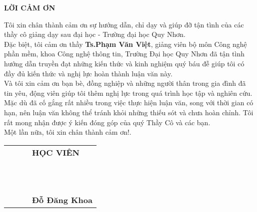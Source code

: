 \newpage
\begin{center}
	\textbf{LỜI CẢM ƠN}
\end{center}
 	
Tôi xin chân thành cảm ơn sự hướng dẫn, chỉ dạy và giúp đỡ tận tình của các thầy cô giảng dạy sau đại học - Trường đại học Quy Nhơn. \\

Đặc biệt, tôi cảm ơn thầy \textbf{Ts.Phạm Văn Việt}, giảng viên bộ môn Công nghệ phần mềm, khoa Công nghệ thông tin, Trường Đại học Quy Nhơn đã tận tình hướng dẫn truyền đạt những kiến thức và kinh nghiệm quý báu đễ giúp tôi có đầy đủ kiến thức và nghị lực hoàn thành luận văn này.\\

Và tôi xin cảm ơn bạn bè, đồng nghiệp và những người thân trong gia đình đã tin yêu, động viên giúp tôi thêm nghị lực trong quá trình học tập và nghiên cứu. \\

Mặc dù đã cố gắng rất nhiều trong việc thực hiện luận văn, song với thời gian có hạn, nên luận văn không thể tránh khỏi những thiếu sót và chưa hoàn chỉnh. Tôi rất mong nhận được ý kiến đóng góp của quý Thầy Cô và các bạn.\\

Một lần nữa, tôi xin chân thành cảm ơn!.


\begin{tabu} to 1.0 \textwidth {  X[c] X[c]  X[c]  X[c]  }

	 & &  & \textbf{HỌC VIÊN} \\
	 \\ \\ \\ \\ \\ \\ \\ \\ \\ \\ \\ 
	 & &  & \textbf{Đỗ Đăng Khoa}  \\

\end{tabu}